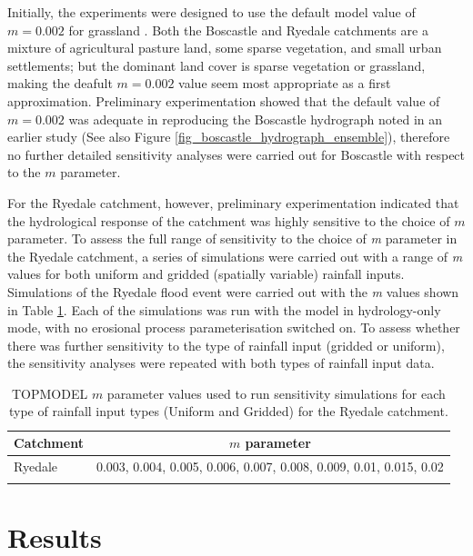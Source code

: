 Initially, the experiments were designed to use the default model value of \(m = 0.002\) for grassland \citep{beven1984testing}. Both the Boscastle and Ryedale catchments are a mixture of agricultural pasture land, some sparse vegetation, and small urban settlements; but the dominant land cover is sparse vegetation or grassland, making the deafult \(m = 0.002\) value seem most appropriate as a first approximation. Preliminary experimentation showed that the default value of \(m = 0.002\) was adequate in reproducing the Boscastle hydrograph noted in an earlier study \citep{wallingford2005flooding} (See also Figure \ref{fig_boscastle_hydrograph_ensemble}), therefore no further detailed sensitivity analyses were carried out for Boscastle with respect to the \(m\) parameter. 

For the Ryedale catchment, however, preliminary experimentation indicated that the hydrological response of the catchment was highly sensitive to the choice of \(m\) parameter. To assess the full range of sensitivity to the choice of \textit{m} parameter in the Ryedale catchment, a series of simulations were carried out with a range of \textit{m} values for both uniform and gridded (spatially variable) rainfall inputs. Simulations of the Ryedale flood event were carried out with the \textit{m} values shown in Table \ref{table-m-sens}. Each of the simulations was run with the model in hydrology-only mode, with no erosional process parameterisation switched on. To assess whether there was further sensitivity to the type of rainfall input (gridded or uniform), the sensitivity analyses were repeated with both types of rainfall input data.

\begin{table}
\begin{tabular}{lc}
\textbf{Catchment} & \textbf{\(m\) parameter} \\
\hline
Ryedale     & 0.003, 0.004, 0.005, 0.006, 0.007, 0.008, 0.009, 0.01, 0.015, 0.02  \\
\hline
\\ 
\end{tabular}
\caption{TOPMODEL \(m\) parameter values used to run sensitivity simulations for each type of rainfall input types (Uniform and Gridded) for the Ryedale catchment. }
\label{table-m-sens}
\end{table}

\section{Results}

